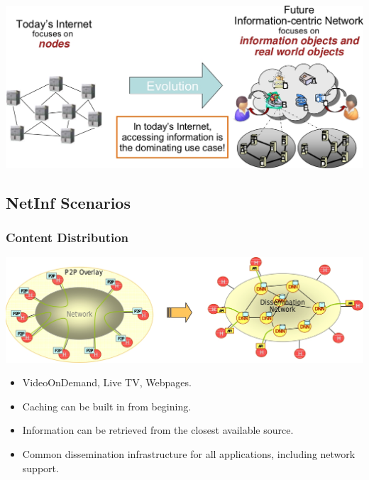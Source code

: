 \documentclass [12pt] {beamer}
\begin{document}
\begin{frame}
\includegraphics[scale=.3,keepaspectratio=true]{netinf1.jpg}
 \end{frame}


\subsection{NetInf Scenarios}

\begin{frame} 
  \frametitle{Content Distribution}
\pause 
    \begin{center}
         \includegraphics[keepaspectratio=true,scale=.22]{Netinf5.jpg}  
    \end{center}

 \begin{itemize} [<+->]
	\item VideoOnDemand, Live TV, Webpages.
	\item Caching can be built in from begining.
	\item Information can be retrieved from the closest available source.
	\item Common dissemination infrastructure for all applications, including network support.
     \end{itemize}
\end{frame}  
\end{document}
